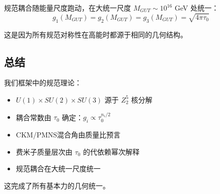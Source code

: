 规范耦合随能量尺度跑动，在大统一尺度 $M_{GUT} \sim 10^{16}$ GeV 处统一：
\begin{equation}
    g_1(M_{GUT}) = g_2(M_{GUT}) = g_3(M_{GUT}) = \sqrt{4\pi\tau_0}
\end{equation}

这是因为所有规范对称性在高能时都源于相同的几何结构。

\subsection{总结}

我们框架中的规范理论：
\begin{itemize}
    \item $U(1) \times SU(2) \times SU(3)$ 源于 $Z_2^5$ 核分解
    \item 耦合常数由 $\tau_0$ 确定：$g_i \propto \tau_0^{n_i/2}$
    \item CKM/PMNS混合角由质量比预言
    \item 费米子质量层次由 $\tau_0$ 的代依赖幂次解释
    \item 规范耦合在大统一尺度统一
\end{itemize}

这完成了所有基本力的几何统一。
